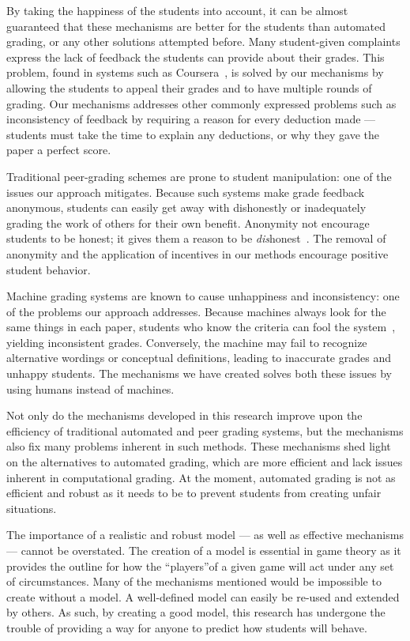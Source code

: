 \documentclass[12pt, Arial]{article}
\begin{document}
By taking the happiness of the students into account, it can be almost guaranteed that these mechanisms are better for the students than automated grading, or any other solutions attempted before. Many student-given complaints express the lack of feedback the students can provide about their grades. This problem, found in systems such as Coursera~\cite{howaccurateispeergrading}, is solved by our mechanisms by allowing the students to appeal their grades and to have multiple rounds of grading. Our mechanisms addresses other commonly expressed problems such as inconsistency of feedback by requiring a reason for every deduction made --- students must take the time to explain any deductions, or why they gave the paper a perfect score.

Traditional peer-grading schemes are prone to student manipulation: one of the issues our approach mitigates. Because such systems make grade feedback anonymous, students can easily get away with dishonestly or inadequately grading the work of others for their own benefit. Anonymity not encourage students to be honest; it gives them a reason to be \emph{dis}honest~\cite{howaccurateispeergrading}. The removal of anonymity and the application of incentives in our methods encourage positive student behavior.

Machine grading systems are known to cause unhappiness and inconsistency: one of the problems our approach addresses. Because machines always look for the same things in each paper, students who know the criteria can fool the system~\cite{robogradingproblems}, yielding inconsistent grades. Conversely, the machine may fail to recognize alternative wordings or conceptual definitions, leading to inaccurate grades and unhappy students. The mechanisms we have created solves both these issues by using humans instead of machines.

Not only do the mechanisms developed in this research improve upon the efficiency of traditional automated and peer grading systems, but the mechanisms also fix many problems inherent in such methods. These mechanisms shed light on the alternatives to automated grading, which are more efficient and lack issues inherent in computational grading. At the moment, automated grading is not as efficient and robust as it needs to be to prevent students from creating unfair situations.

The importance of a realistic and robust model --- as well as effective mechanisms --- cannot be overstated. The creation of a model is essential in game theory as it provides the outline for how the ``players''of a given game will act under any set of circumstances. Many of the mechanisms mentioned would be impossible to create without a model. A well-defined model can easily be re-used and extended by others. As such, by creating a good model, this research has undergone the trouble of providing a way for anyone to predict how students will behave. 
\end{document}
